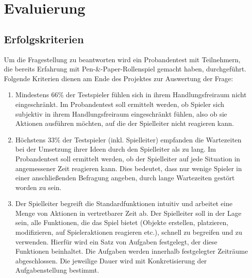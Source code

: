 \chapter{Evaluierung}
\label{evaluation}


\section{Erfolgskriterien}
\label{sec:Erfolgskriterien}
Um die Fragestellung zu beantworten wird ein Probandentest mit Teilnehmern, die bereits Erfahrung mit Pen-\&-Paper-Rollenspiel gemacht haben, durchgeführt. Folgende Kriterien dienen am Ende des Projektes zur
Auswertung der Frage:

\begin{enumerate}
	\item Mindestens 66\% der Testspieler fühlen sich in ihrem Handlungsfreiraum nicht eingeschränkt. Im Probandentest soll ermittelt werden, ob Spieler sich subjektiv in ihrem Handlungsfreiraum eingeschränkt fühlen, also ob sie Aktionen ausführen möchten, auf die der Spielleiter nicht reagieren kann.
	\item Höchstens 33\% der Testspieler (inkl. Spielleiter) empfanden die Wartezeiten bei der Umsetzung ihrer Ideen durch den Spielleiter als zu lang. Im Probandentest soll ermittelt werden, ob der Spielleiter auf jede Situation in angemessener Zeit reagieren kann. Dies bedeutet, dass nur wenige Spieler in einer anschließenden Befragung angeben, durch lange Wartezeiten gestört worden zu sein.
	\item Der Spielleiter begreift die Standardfunktionen intuitiv und arbeitet eine Menge von Aktionen in vertretbarer Zeit ab. Der Spielleiter soll in der Lage sein, alle Funktionen, die das Spiel bietet (Objekte erstellen, platzieren, modifizieren, auf Spieleraktionen reagieren etc.), schnell zu begreifen und zu verwenden. Hierfür wird ein Satz von Aufgaben festgelegt, der diese Funktionen beinhaltet. Die Aufgaben werden innerhalb festgelegter Zeiträume abgeschlossen. Die jeweilige Dauer wird mit Konkretisierung der Aufgabenstellung bestimmt.
\end{enumerate}

